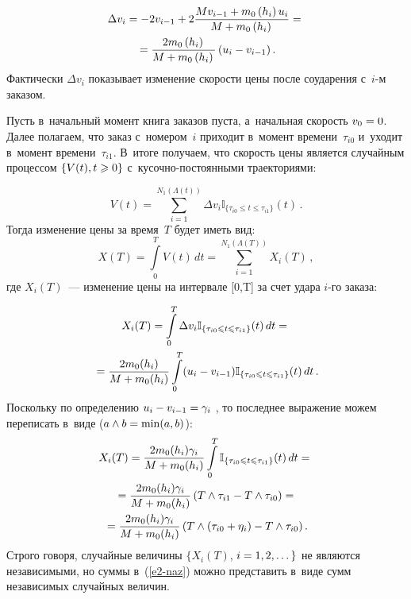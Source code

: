 \begin{multicols}{2}
\noindent
\begin{multline*}
\Delta v_i = -2v_{i-1} +2\displaystyle\frac{\displaystyle Mv_{i-1}+ m_0\left(h_i\right)u_i\mathstrut}{\displaystyle M+ m_0\left(h_i\right)\mathstrut} = {}\\
{}=
\displaystyle\frac{\displaystyle 2 m_0\left(h_i\right)\mathstrut}{\displaystyle M+ m_0\left(h_i\right)\mathstrut}\left(u_{i}-v_{i-1}\right).
\end{multline*}
Фактически $\Delta v_i$ показывает изменение ско\-рости цены после соударения 
с~$i$-м заказом.

Пусть в~начальный момент книга заказов пус\-та, а~начальная скорость $v_0 \hm= 0$. 
Далее полагаем, что заказ с~номером~$i$ приходит в~момент времени~$\tau_{i0}$ и~уходит 
в~момент времени~$\tau_{i1}$. В~итоге получаем, что скорость цены является случайным 
процессом $\{V(t), t\hm\geqslant0\}$ с~ку\-соч\-но-по\-сто\-ян\-ны\-ми траекто\-риями:

\noindent
\begin{equation*}
V(t) = \sum\limits_{i=1}^{N_1(\Lambda(t))}\Delta v_i\mathbb{I}_{\{\tau_{i0}\le t\le 
\tau_{i1}\}}(t)\,.
\end{equation*}
Тогда изменение цены за время~$T$ будет иметь вид:
\begin{equation}
X(T) = \int\limits_{0}^{{T}} V(t)\, dt = \sum\limits_{i=1}^{N_1(\Lambda(T))}X_i(T)\,,
\label{e2-naz}
\end{equation}
где $X_i(T)$~--- изменение цены на интервале [0,T] за счет удара $i$-го заказа:

\vspace*{-2pt}

\noindent
\begin{multline*}
X_i(T) = \int\limits_{0}^{{T}} \Delta v_i\mathbb{I}_{\{\tau_{i0}\leqslant 
t\leqslant \tau_{i1}\}}(t)\,dt ={}\\
{}= \displaystyle\frac{\displaystyle 2 m_0(h_i)\mathstrut}{\displaystyle M+ m_0(h_i)\mathstrut}
\int\limits_{0}^{{T}}(u_{i}-v_{i-1})\mathbb{I}_{\{\tau_{i0}\leqslant t
\leqslant \tau_{i1}\}}(t)\,dt\,.
\end{multline*}
Поскольку по определению $u_{i}\hm-v_{i-1} \hm= \gamma_i$ , то последнее 
выражение можем переписать в~виде ($a \wedge b\hm = \min(a,b)$):
\begin{multline*}
X_i(T)=\displaystyle\frac{\displaystyle 2 m_0(h_i)\gamma_i\mathstrut}{\displaystyle M+ m_0(h_i)\mathstrut}\int\limits_{0}^{{T}}
\mathbb{I}_{\{\tau_{i0}\leqslant t\leqslant \tau_{i1}\}}(t)\,dt = {}\\
{}=
\displaystyle\frac{\displaystyle 2 m_0(h_i)\gamma_i\mathstrut}{\displaystyle M+ m_0(h_i)\mathstrut}\left(T\wedge\tau_{i1}-
T\wedge\tau_{i0}\right) ={}\\
{}=\displaystyle\frac{\displaystyle 2 m_0(h_i)\gamma_i\mathstrut}{\displaystyle M+ m_0(h_i)\mathstrut}
\left(T\wedge\left(\tau_{i0}+\eta_i\right)-T\wedge\tau_{i0}\right).
\end{multline*}
Строго говоря, случайные величины $\{X_i(T)$, $i\hm=1,2,\dots\}$ не являются 
независимыми, но суммы в~(\ref{e2-naz}) можно представить в~виде сумм 
независимых случайных величин. 


\end{multicols}
